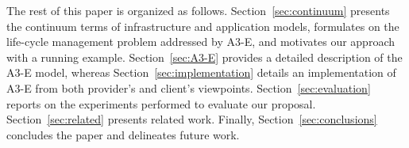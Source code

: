 








The rest of this paper is organized as follows. Section~\ref{sec:continuum} presents the continuum terms of infrastructure and application models, formulates on the life-cycle management problem addressed by A3-E, and motivates our approach with a running example.
Section~\ref{sec:A3-E} provides a detailed description of the A3-E model, whereas Section~\ref{sec:implementation} details an implementation of A3-E from both provider's and client's viewpoints. Section~\ref{sec:evaluation} reports on the experiments performed to evaluate our proposal. Section~\ref{sec:related} presents related work. Finally, Section~\ref{sec:conclusions} concludes the paper and delineates future work.

